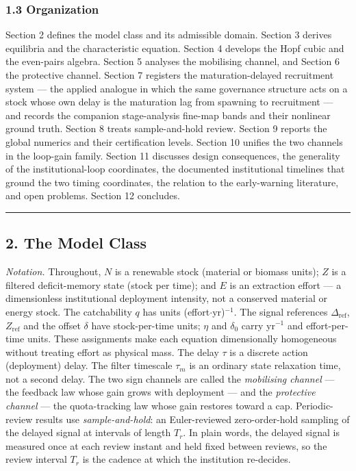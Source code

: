 \documentclass[11pt]{article}
\begin{document}
\subsubsection{1.3 Organization}\label{organization}

Section 2 defines the model class and its admissible domain. Section 3
derives equilibria and the characteristic equation. Section 4 develops
the Hopf cubic and the even-pairs algebra. Section 5 analyses the
mobilising channel, and Section 6 the protective channel. Section 7
registers the maturation-delayed recruitment system --- the applied
analogue in which the same governance structure acts on a stock whose
own delay is the maturation lag from spawning to recruitment --- and
records the companion stage-analysis fine-map bands and their nonlinear
ground truth. Section 8 treats sample-and-hold review. Section 9 reports
the global numerics and their certification levels. Section 10 unifies
the two channels in the loop-gain family. Section 11 discusses design
consequences, the generality of the institutional-loop coordinates, the
documented institutional timelines that ground the two timing
coordinates, the relation to the early-warning literature, and open
problems. Section 12 concludes.

\begin{center}\rule{0.5\linewidth}{0.5pt}\end{center}

\subsection{2. The Model Class}\label{the-model-class}

\emph{Notation.} Throughout, \(N\) is a renewable stock (material or
biomass units); \(Z\) is a filtered deficit-memory state (stock per
time); and \(E\) is an extraction effort --- a dimensionless
institutional deployment intensity, not a conserved material or energy
stock. The catchability \(q\) has units (effort\ensuremath{\cdot}yr)\(^{-1}\). The signal
references \(\Delta_{\mathrm{ref}}\), \(Z_{\mathrm{ref}}\) and the
offset \(\delta\) have stock-per-time units; \(\eta\) and \(\delta_0\)
carry yr\(^{-1}\) and effort-per-time units. These assignments make each
equation dimensionally homogeneous without treating effort as physical
mass. The delay \(\tau\) is a discrete action (deployment) delay. The
filter timescale \(\tau_m\) is an ordinary state relaxation time, not a
second delay. The two sign channels are called the \emph{mobilising
channel} --- the feedback law whose gain grows with deployment --- and
the \emph{protective channel} --- the quota-tracking law whose gain
restores toward a cap. Periodic-review results use
\emph{sample-and-hold}: an Euler-reviewed zero-order-hold sampling of
the delayed signal at intervals of length \(T_r\). In plain words, the
delayed signal is measured once at each review instant and held fixed
between reviews, so the review interval \(T_r\) is the cadence at which
the institution re-decides.
\end{document}
